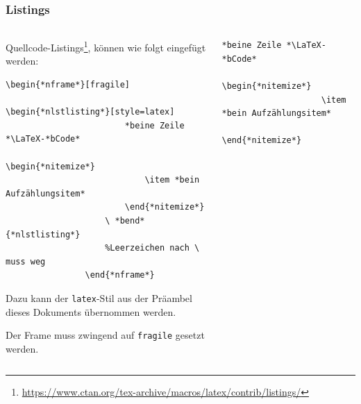 \documentclass[german,notoc]{tudbeamer}%
\begin{document}
\begin{frame}[fragile]
	\frametitle{Listings}

	\begin{columns}[T,onlytextwidth]
		\begin{column}{.475\textwidth}
			Quellcode-Listings\footnote[frame]{\url{https://www.ctan.org/tex-archive/macros/latex/contrib/listings/}}, können wie folgt eingefügt werden:
			\begin{lstlisting}[gobble=8,style=latex,mathescape]
				\begin{*nframe*}[fragile]
					\begin{*nlstlisting*}[style=latex]
						*beine Zeile *\LaTeX-*bCode*
						\begin{*nitemize*}
							\item *bein Aufzählungsitem*
						\end{*nitemize*}
					\ *bend*{*nlstlisting*}
					%Leerzeichen nach \ muss weg
				\end{*nframe*}
			\end{lstlisting}
			Dazu kann der \texttt{latex}-Stil aus der Präambel dieses Dokuments übernommen werden.

			Der Frame muss zwingend auf \texttt{fragile} gesetzt werden.
		\end{column}
		\begin{column}{.475\textwidth}			
			\begin{lstlisting}[gobble=8,style=latex]
				*beine Zeile *\LaTeX-*bCode*
				\begin{*nitemize*}
					\item *bein Aufzählungsitem*
				\end{*nitemize*}
			\end{lstlisting}
		\end{column}
	\end{columns}
\end{frame}
\end{document}
